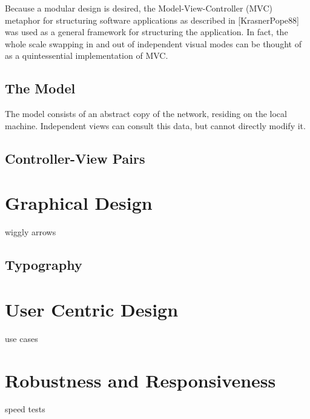	Because a modular design is desired, the Model-View-Controller (MVC) metaphor for structuring software applications as described in [KrasnerPope88] was used as a general framework for structuring the application. In fact, the whole scale swapping in and out of independent visual modes can be thought of as a quintessential implementation of MVC. 
	
\subsection{The Model}

	The model consists of an abstract copy of the network, residing on the local machine. Independent views can consult this data, but cannot directly modify it.

\subsection{Controller-View Pairs}

\section{Graphical Design}
	wiggly arrows
\subsection{Typography}
	
\section{User Centric Design}
	use cases

\section{Robustness and Responsiveness}
	speed tests
